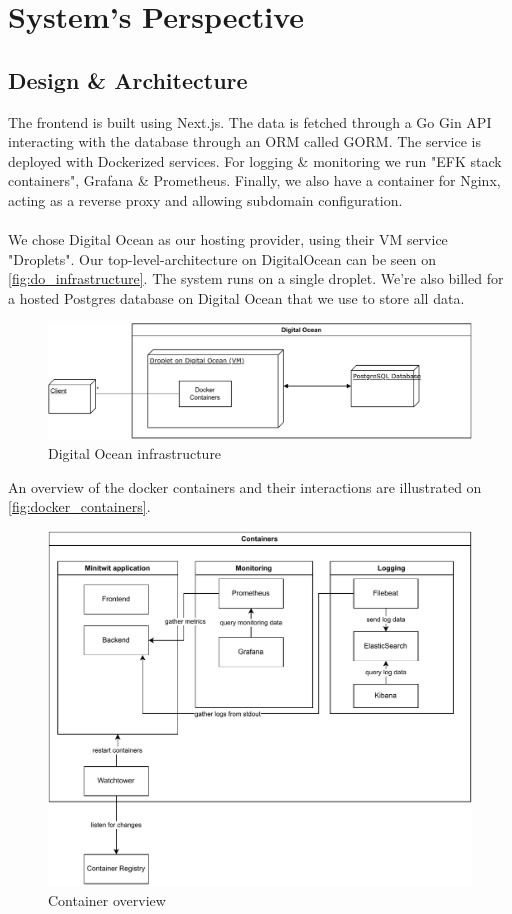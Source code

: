 \section{System's Perspective}
\subsection{Design \& Architecture}
The frontend is built using Next.js\cite{nextjs}. The data is fetched through a Go Gin\cite{gin-gonic} API interacting with the database through an ORM called GORM\cite{gorm}. The service is deployed with Dockerized services. For logging \& monitoring we run "EFK stack containers", Grafana \& Prometheus. Finally, we also have a container for Nginx, acting as a reverse proxy and allowing subdomain configuration.
\\\\
We chose Digital Ocean as our hosting provider, using their VM service "Droplets". Our top-level-architecture on DigitalOcean can be seen on \autoref{fig:do_infrastructure}. The system runs on a single droplet. We're also billed for a hosted Postgres database on Digital Ocean that we use to store all data. 

\begin{figure}[h!]
    \centering
    \includegraphics[scale=0.65]{diagrams/infrastructure.pdf}
    \caption{Digital Ocean infrastructure}
    \label{fig:do_infrastructure}
\end{figure}
An overview of the docker containers and their interactions are illustrated on \autoref{fig:docker_containers}.

\begin{figure}[h!]
    \centering
    \includegraphics[scale=0.8]{report/diagrams/containers.pdf}
    \caption{Container overview}
    \label{fig:docker_containers}
\end{figure}

